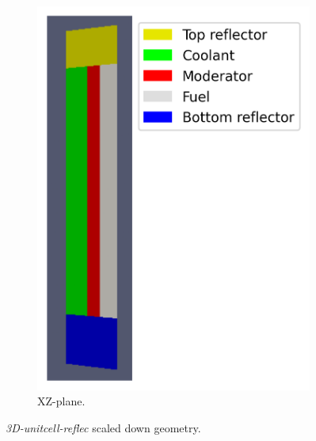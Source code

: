 \documentclass[11pt,letterpaper]{article}
\begin{document}
\begin{figure}[htbp!]
\begin{subfigure}[t]{0.4\textwidth}
			\includegraphics[width=\linewidth]{3D-unitcell-reflec-meshB}
			\caption{XZ-plane.}
		\end{subfigure}
		\hfill
		\caption{\textit{3D-unitcell-reflec} scaled down geometry.}
		\label{fig:3D-unitcell-reflec}
	\end{figure}
\end{document}
